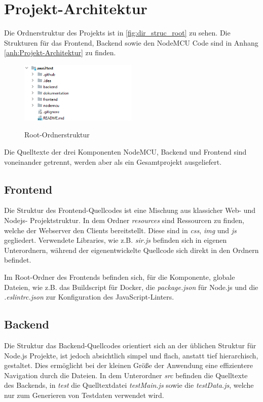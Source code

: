 

\section{Projekt-Architektur}\label{Projekt-Architektur}
Die Ordnerstruktur des Projekts ist in \autoref{fig:dir_struc_root} zu sehen.
Die Strukturen für das Frontend, Backend sowie den NodeMCU Code sind in Anhang \ref{anh:Projekt-Architektur} zu finden.

\begin{figure}[H]
    \centering
    \begin{minipage}[t]{1\textwidth}
        \caption{Root-Ordnerstruktur}
        \includegraphics[width=0.5\textwidth]{img/dir_struc_root.png}\\
        \label{fig:dir_struc_root}
    \end{minipage}
\end{figure}

Die Quelltexte der drei Komponenten NodeMCU, Backend und Frontend sind voneinander getrennt, werden aber als ein Gesamtprojekt ausgeliefert.

\subsection{Frontend}
Die Struktur des Frontend-Quellcodes ist eine Mischung aus klassicher Web- und Nodejs- Projektstruktur.
In dem Ordner \textit{resources} sind Ressourcen zu finden, welche der Webserver den Clients bereitstellt.
Diese sind in \textit{css}, \textit{img} und \textit{js} gegliedert.
Verwendete Libraries, wie z.B. \textit{sir.js} befinden sich in eigenen Unterordnern, während der eigenentwickelte
Quellcode sich direkt in den Ordnern befindet.

Im Root-Ordner des Frontends befinden sich, für die Komponente, globale Dateien, wie z.B. das Buildscript für Docker,
die \textit{package.json} für Node.js und die \textit{.eslintrc.json} zur Konfiguration des JavaScript-Linters.

\subsection{Backend}
Die Struktur das Backend-Quellcodes orientiert sich an der üblichen Struktur für Node.js Projekte, ist jedoch
absichtlich simpel und flach, anstatt tief hierarchisch, gestaltet.
Dies ermöglicht bei der kleinen Größe der Anwendung eine effizientere Navigation durch die Dateien.
In dem Unterordner \textit{src} befinden die Quelltexte des Backends, in \textit{test} die Quelltextdatei \textit{testMain.js}
sowie die \textit{testData.js}, welche nur zum Generieren von Testdaten verwendet wird.

